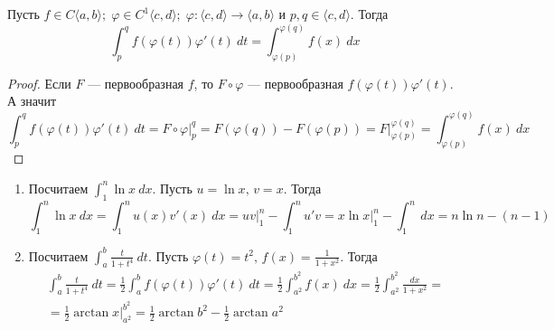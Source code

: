 \begin{theorem}
    Пусть $f \in C\langle a, b \rangle;\; \varphi \in C^{1}\langle c, d\rangle;\; \varphi\colon \langle c, d\rangle \to \langle a, b \rangle$ и $p, q \in \langle c, d \rangle$. Тогда
    \begin{equation*}
    \int_{p}^{q} f(\varphi(t))\varphi'(t) \: dt = \int_{\varphi(p)}^{\varphi(q)} f(x) \: dx
    \end{equation*}
\end{theorem}
\begin{proof}
    Если $F$ --- первообразная $f$, то $F \circ \varphi$ --- первообразная $f(\varphi(t))\varphi'(t)$. А значит
    \begin{equation*}
      \int_{p}^{q} f(\varphi(t))\varphi'(t) \: dt =
      F \circ \varphi \big|_{p}^{q} =
      F(\varphi(q)) - F(\varphi(p)) =
      F \big|_{\varphi(p)}^{\varphi(q)} =
      \int_{\varphi(p)}^{\varphi(q)} f(x) \: dx
    \end{equation*}
\end{proof}

\begin{examples}
  \begin{enumerate}
    \item
      Посчитаем $\displaystyle \int_{1}^{n} \ln x \: dx$. Пусть $u = \ln x,\, v = x$. Тогда
      \begin{equation*}
        \int_{1}^{n} \ln x \: dx = \int_{1}^{n} u(x)v'(x) \: dx = uv \big|_{1}^{n} - \int_{1}^{n} u'v = x\ln x \big|_{1}^{n} - \int_{1}^{n} \: dx = n \ln n - (n - 1)
      \end{equation*}
    \item
      Посчитаем $\displaystyle \int_{a}^{b} \frac{t}{1 + t^4} \: dt$. Пусть $\varphi(t) = t^2,\, f(x) = \frac{1}{1 + x^2}$. Тогда
      \begin{equation*}
        \begin{gathered}
          \int_{a}^{b} \frac{t}{1 + t^4} \: dt =
          \frac{1}{2}\int_{a}^{b} f(\varphi(t))\varphi'(t) \: dt =
          \frac{1}{2} \int_{a^2}^{b^2} f(x) \: dx =
          \frac{1}{2} \int_{a^2}^{b^2} \frac{dx}{1 + x^2}
          = \\ =
          \frac{1}{2} \arctan x \big|_{a^2}^{b^2} =
          \frac{1}{2} \arctan b^2 - \frac{1}{2} \arctan a^2
        \end{gathered}
      \end{equation*}
  \end{enumerate}
\end{examples}